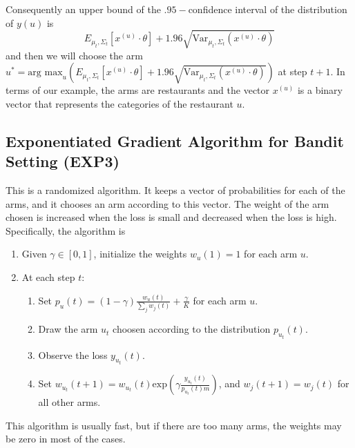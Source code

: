 \documentclass{article}
\theoremstyle{plain}
\theoremstyle{definition}
\begin{document}
Consequently an upper bound of the $.95-$confidence interval of the distribution
of $y\left(u\right)$ is 
\[
E_{\mu_{t},\Sigma_{t}}\left[x^{\left(u\right)}\cdot\theta\right]+1.96\sqrt{\mbox{Var}_{\mu_{t},\Sigma_{t}}\left(x^{\left(u\right)}\cdot\theta\right)}
\]
and then we will choose the arm $u^{*}=\mbox{arg max}_{u}\left(E_{\mu_{t},\Sigma_{t}}\left[x^{\left(u\right)}\cdot\theta\right]+1.96\sqrt{\mbox{Var}_{\mu_{t},\Sigma_{t}}\left(x^{\left(u\right)}\cdot\theta\right)}\right)$
at step $t+1$. In terms of our example, the arms are restaurants
and the vector $x^{\left(u\right)}$ is a binary vector that represents
the categories of the restaurant $u$.

\subsection{Exponentiated Gradient Algorithm for Bandit Setting (EXP3)}

This is a randomized algorithm. It keeps a vector of probabilities
for each of the arms, and it chooses an arm according to this vector.
The weight of the arm chosen is increased when the loss is small and
decreased when the loss is high. Specifically, the algorithm is
\begin{enumerate}
\item Given $\gamma\in\left[0,1\right]$, initialize the weights $w_{u}\left(1\right)=1$
for each arm $u$.
\item At each step $t$:

\begin{enumerate}
\item Set $p_{u}\left(t\right)=\left(1-\gamma\right)\frac{w_{u}\left(t\right)}{\sum_{j}w_{j}\left(t\right)}+\frac{\gamma}{K}$
for each arm $u$.
\item Draw the arm $u_{t}$ choosen according to the distribution $p_{u_{t}}\left(t\right)$.
\item Observe the loss $y_{u_{t}}\left(t\right)$.
\item Set $w_{u_{t}}\left(t+1\right)=w_{u_{t}}\left(t\right)\mbox{exp}\left(\gamma\frac{y_{u_{t}}\left(t\right)}{p_{u_{t}}\left(t\right)m}\right)$,
and $w_{j}\left(t+1\right)=w_{j}\left(t\right)$ for all other arms. 
\end{enumerate}
\end{enumerate}
This algorithm is usually fast, but if there are too many arms, the
weights may be zero in most of the cases. 
\end{document}
